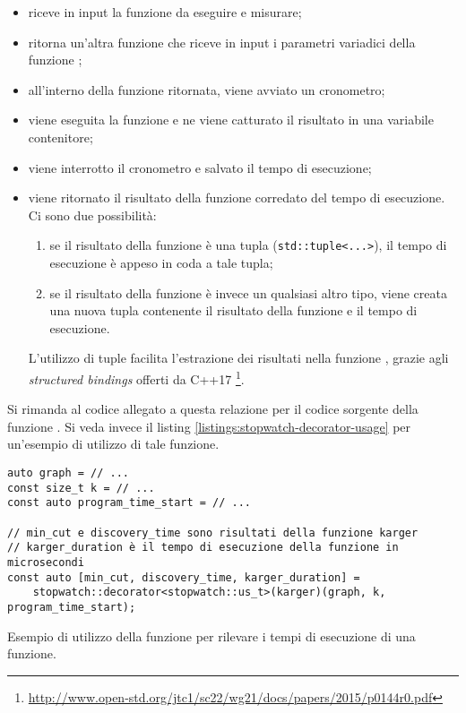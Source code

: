 \begin{itemize}
    \item riceve in input la funzione  da eseguire e
      misurare;
    \item ritorna un'altra funzione che riceve in input i parametri
      variadici  della funzione ;
    \item all'interno della funzione ritornata, viene avviato un
      cronometro;
    \item viene eseguita la funzione e ne viene catturato il risultato
      in una variabile contenitore;
    \item viene interrotto il cronometro e salvato il tempo di
      esecuzione;
    \item viene ritornato il risultato della funzione corredato del
      tempo di esecuzione. Ci sono due possibilità:
    \begin{enumerate}
        \item se il risultato della funzione è una tupla
          (\texttt{std::tuple<...>}), il tempo di esecuzione
          è appeso in coda a tale tupla;
        \item se il risultato della funzione è invece un
          qualsiasi altro tipo, viene creata una nuova tupla
          contenente il risultato della funzione e il tempo di
          esecuzione.
    \end{enumerate}

    \noindent L'utilizzo di tuple facilita l'estrazione dei risultati nella funzione , grazie agli \textit{structured bindings} offerti da C++17 \footnote{\url{http://www.open-std.org/jtc1/sc22/wg21/docs/papers/2015/p0144r0.pdf}}.
\end{itemize}

\noindent Si rimanda al codice allegato a questa relazione per il codice sorgente della funzione . Si veda invece il listing
\ref{listings:stopwatch-decorator-usage} per un'esempio di utilizzo di
tale funzione.

\begin{listing}[!ht]
\begin{verbatim}
auto graph = // ...
const size_t k = // ...
const auto program_time_start = // ...

// min_cut e discovery_time sono risultati della funzione karger
// karger_duration è il tempo di esecuzione della funzione in microsecondi
const auto [min_cut, discovery_time, karger_duration] =
    stopwatch::decorator<stopwatch::us_t>(karger)(graph, k, program_time_start);

\end{verbatim}
\caption{Esempio di utilizzo della funzione  per
  rilevare i tempi di esecuzione di una funzione.}
\label{listings:stopwatch-decorator-usage}
\end{listing}

